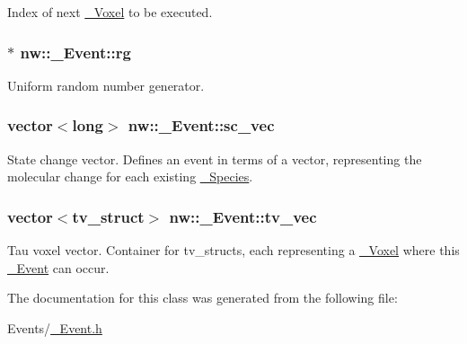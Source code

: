 Index of next \hyperlink{classnw_1_1___voxel}{\+\_\+\+Voxel} to be executed. 

\hypertarget{classnw_1_1___event_af92482aeea55562560573ecccd5ab108}{
\subsubsection[{rg}]{$\ast$ nw\+::\+\_\+\+Event\+::rg\hspace{0.3cm}{\ttfamily [protected]}}}\label{classnw_1_1___event_af92482aeea55562560573ecccd5ab108}


Uniform random number generator. 

\hypertarget{classnw_1_1___event_a560c8b6f9954a43f5d5f80204473b64d}{
\subsubsection[{sc\+\_\+vec}]{\setlength{\rightskip}{0pt plus 5cm}vector$<$long$>$ nw\+::\+\_\+\+Event\+::sc\+\_\+vec\hspace{0.3cm}{\ttfamily [protected]}}}\label{classnw_1_1___event_a560c8b6f9954a43f5d5f80204473b64d}


State change vector. Defines an event in terms of a vector, representing the molecular change for each existing \hyperlink{classnw_1_1___species}{\+\_\+\+Species}. 

\hypertarget{classnw_1_1___event_a6351b58d94923ed58e0b2cf6c9445d2e}{
\subsubsection[{tv\+\_\+vec}]{\setlength{\rightskip}{0pt plus 5cm}vector$<${\bf tv\+\_\+struct}$>$ nw\+::\+\_\+\+Event\+::tv\+\_\+vec\hspace{0.3cm}{\ttfamily [protected]}}}\label{classnw_1_1___event_a6351b58d94923ed58e0b2cf6c9445d2e}


Tau voxel vector. Container for tv\+\_\+structs, each representing a \hyperlink{classnw_1_1___voxel}{\+\_\+\+Voxel} where this \hyperlink{classnw_1_1___event}{\+\_\+\+Event} can occur. 



The documentation for this class was generated from the following file\+:\begin{DoxyCompactItemize}
\item 
Events/\hyperlink{___event_8h}{\+\_\+\+Event.\+h}\end{DoxyCompactItemize}
